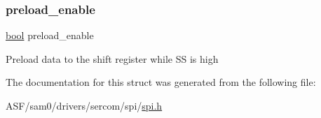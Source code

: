 \subsubsection{\texorpdfstring{preload\_enable}{preload\_enable}}
{\footnotesize\ttfamily \mbox{\hyperlink{group__group__sam0__utils_ga97a80ca1602ebf2303258971a2c938e2}{bool}} preload\+\_\+enable}

Preload data to the shift register while SS is high 

The documentation for this struct was generated from the following file\+:\begin{DoxyCompactItemize}
\item 
A\+S\+F/sam0/drivers/sercom/spi/\mbox{\hyperlink{spi_8h}{spi.\+h}}\end{DoxyCompactItemize}

